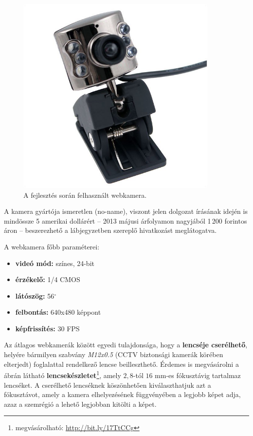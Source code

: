 \begin{figure}[!ht]
\centering
\includegraphics[width=100mm, keepaspectratio]{figures/webcam.png}
\caption{A fejlesztés során felhasznált webkamera.}
\label{fig:webcam}
\end{figure}

A kamera gyártója ismeretlen (no-name), viszont jelen dolgozat írásának idején is mindössze 5 amerikai dollárért  -- 2013 májusi árfolyamon nagyjából 1\,200 forintos áron -- beszerezhető a lábjegyzetben szereplő hivatkozást meglátogatva.

A webkamera főbb paraméterei:

\begin{itemize}
  \item \textbf{videó mód:} színes, 24-bit 
  \item \textbf{érzékelő:} 1/4 CMOS
  \item \textbf{látószög:} 56$^{\circ}$
  \item \textbf{felbontás:} 640x480 képpont
  \item \textbf{képfrissítés:} 30 FPS
\end{itemize}

Az átlagos webkamerák között egyedi tulajdonsága, hogy a \textbf{lencséje cserélhető}, helyére bármilyen szabvány \emph{M12x0.5} (CCTV biztonsági kamerák körében elterjedt) foglalattal rendelkező lencse beilleszthető. Érdemes is megvásárolni a  ábrán látható \textbf{lencsekészletet}\footnote{megvásárolható: \url{http://bit.ly/17TtCCg}}, amely $2,\!8$-tól $16$ mm-es fókusztávig tartalmaz lencséket. A cserélhető lencséknek köszönhetően kiválaszthatjuk azt a fókusztávot, amely a kamera elhelyezésének függvényében a legjobb képet adja, azaz a szemrégió a lehető legjobban kitölti a képet.

